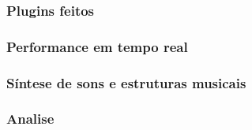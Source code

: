 \subsubsection{Plugins feitos}
\label{sec:tutoriais}

\subsubsection{Performance em tempo real}
\label{sec:perf}
  
\subsubsection{Síntese de sons e estruturas musicais}
\label{sec:sintese}

\subsubsection{Analise}
\label{sec:analise}